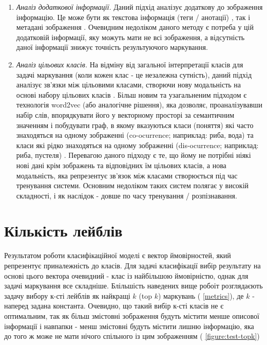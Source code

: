 \documentclass{udstu}
\begin{document}
\begin{enumerate}
	\item \textit{Аналіз додаткової інформації.}
	Даний підхід аналізує додаткову до зображення інформацію.
	Це може бути як текстова інформація (теги / анотації) \cite{cnn-sinn,sr-cnn-rnn},
	так і метадані зображення \cite{cnn-neighbors,cnn-location}.
	Очевидним недоліком даного методу є потреба у цій додатковій інформації,
	яку можуть мати не всі зображення, а відсутність даної інформації
	знижує точність результуючого маркування.

	\item \textit{Аналіз цільових класів.}
	На відміну від загальної інтерпретації класів для задачі маркування
	(коли кожен клас - це незалежна сутність), даний підхід аналізує зв'язки між цільовими класами,
	створючи нову модальність на основі набору цільових класів \cite{srn}.
	Більш новим та узагальненим підходом є технологія word2vec (або аналогічне рішення), яка дозволяє,
	проаналізувавши набір слів, впорядкувати його у векторному просторі за семантичним значенням
	і побудувати граф, в якому вказуються класи (поняття) які часто знаходяться на одному зображенні
	(co-ocurrence; наприклад: риба, вода) та класи які рідко знаходяться
	на одному зображенні (dis-ocurrence; наприклад: риба, пустеля) \cite{q2l, cpsd, cma}.
	Перевагою даного підходу є те, що йому не потрібні ніякі нові дані крім зображень та
	відповідних їм цільових класів, а нова модальність, яка репрезентує зв'язок між класами
	створюється під час тренування системи. Основним недоліком таких систем полягає у
	високій складності, і як наслідок - довше по часу тренування / розпізнавання.
\end{enumerate}

\clearpage

\section{Кількість лейблів}

Результатом роботи класифікаційної моделі є вектор ймовірностей, який репрезентує приналежність до класів.
Для задачі класифікації вибір результату на основі цього вектора очевидний - клас із найбільшою ймовірністю, однак
для задачі маркування все складніше.
Блільшість наведених вище робоіт розглядаєють задачу вибору к-сті лейблів як найкращі $k$ (top $k$) маркувань (\chaptername{ \ref{metrics}}),
де $k$ - наперед задана константа. Очевидно, що такий вибір к-сті класів не є оптимальним,
так як більш змістовні зображення будуть містити менше описової інформації і навпапки - менш змістовні будуть
містити лишню інформацію, яка до того ж може не мати нічого спільного із цим зображенням (\figurename{ \ref{figure:test-topk}})
\end{document}
